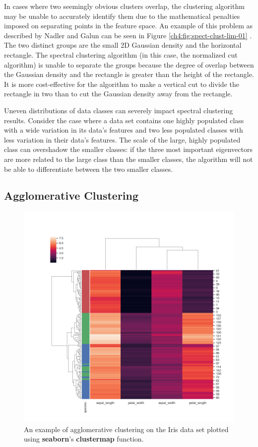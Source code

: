 In cases where two seemingly obvious clusters overlap, the clustering algorithm may be unable to accurately identify them due to the mathematical penalties imposed on separating points in the feature space. An example of this problem as described by Nadler and Galun can be seen in Figure \ref{ch4:fig:spect-clust-lim-01} \cite{Nadler2007}. The two distinct groups are the small 2D Gaussian density and the horizontal rectangle. The spectral clustering algorithm (in this case, the normalized cut algorithm) is unable to separate the groups because the degree of overlap between the Gaussian density and the rectangle is greater than the height of the rectangle. It is more cost-effective for the algorithm to make a vertical cut to divide the rectangle in two than to cut the Gaussian density away from the rectangle.

Uneven distributions of data classes can severely impact spectral clustering results. Consider the case where a data set contains one highly populated class with a wide variation in its data's features and two less populated classes with less variation in their data's features. The scale of the large, highly populated class can overshadow the smaller classes: if the three most important eigenvectors are more related to the large class than the smaller classes, the algorithm will not be able to differentiate between the two smaller classes.

\subsection{Agglomerative Clustering}

\begin{figure}
\centering
\includegraphics[width=.9\textwidth]{4/clustermap-example.png}
\caption{An example of agglomerative clustering on the Iris data set plotted using \textbf{seaborn}'s \textbf{clustermap} function.}
\label{ch4:fig:agg}
\end{figure}

